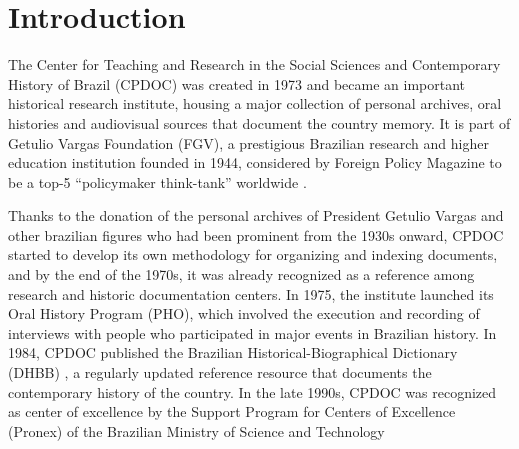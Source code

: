 \section{Introduction}\label{sec:intro}

%

The Center for Teaching and Research in the Social Sciences and
Contemporary History of Brazil (CPDOC) was created in 1973 and became
an important historical research institute, housing a major collection
of personal archives, oral histories and audiovisual sources that
document the country memory. It is part of Getulio Vargas Foundation
(FGV), a prestigious Brazilian research and higher education
institution founded in 1944, considered by Foreign Policy Magazine to
be a top-5 ``policymaker think-tank'' worldwide \cite{think-tank}.

Thanks to the donation of the personal archives of President Getulio
Vargas and other brazilian figures who had been prominent from the
1930s onward, CPDOC started to develop its own methodology for
organizing and indexing documents, and by the end of the 1970s, it was
already recognized as a reference among research and historic
documentation centers. In 1975, the institute launched its Oral
History Program (PHO), which involved the execution and recording of
interviews with people who participated in major events in Brazilian
history. In 1984, CPDOC published the Brazilian
Historical-Biographical Dictionary (DHBB) \cite{dhbb}, a regularly
updated reference resource that documents the contemporary history of
the country. In the late 1990s, CPDOC was recognized as center of
excellence by the Support Program for Centers of Excellence (Pronex)
of the Brazilian Ministry of Science and Technology

